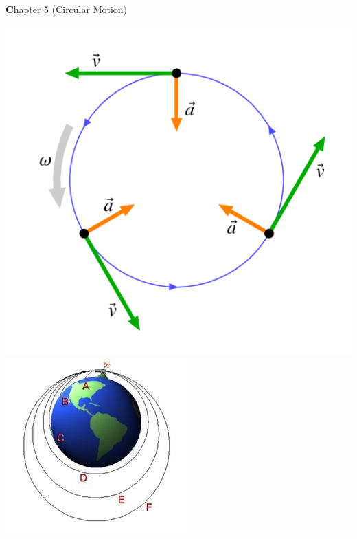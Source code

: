 \documentclass[10pt]{exam}
\author{Rohrbach}
\date{\today}
\def\mytitle{Chapter 5 (Circular Motion)}
\def\mymaketitle{
  \begin{flushleft}
    {\LARGE \textbf \mytitle \par}
  \end{flushleft}
}
\begin{document}
\mymaketitle



\newcommand{\stampbox}[1]{

  \hfill
  \begin{tikzpicture}[every text node part/.style={align=center}]
     \node[gray!50,draw,rounded corners] at (0,0) 
      {\sc Stamp \\ \sc Here \\ \small #1 \sc Points};
  \end{tikzpicture}
  \vspace{1em}
  
  \hrule

}

\begin{center}

  \includegraphics[scale=0.3]{circ.png} \hspace{10em}
  \includegraphics[scale=0.6]{orbitingcannonballs.jpg}
\end{center}
\end{document}
